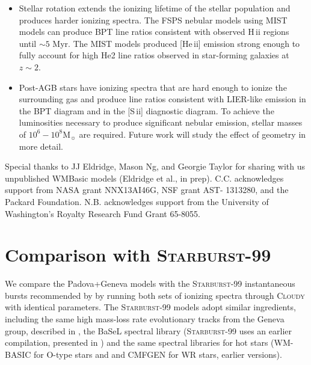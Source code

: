 \documentclass[trackchanges, twocolumn, tighten]{aastex61}
\newcommand{\FSPS}{{\sc FSPS}\xspace}
\newcommand{\SB}{\textsc{Starburst-99}\xspace}
\newcommand{\Cloudy}{\textsc{Cloudy}\xspace}
\newcommand{\sii}{[S\,{\sc ii}]\xspace}
\newcommand{\heii}{[He\,{\sc ii}]\xspace}
\newcommand\Msun{\ensuremath{\mathrm{M_{\sun}}}}
\newcommand{\hii}{H\,{\sc ii}\xspace}
\begin{document}
\begin{itemize}
\item Stellar rotation extends the ionizing lifetime of the stellar population and produces harder ionizing spectra. The \FSPS nebular models using MIST models can produce BPT line ratios consistent with observed \hii regions until ${\sim}5$ Myr. The MIST models produced \heii emission strong enough to fully account for high He2 line ratios observed in star-forming galaxies at $z{\sim}2$.
\item Post-AGB stars have ionizing spectra that are hard enough to ionize the surrounding gas and produce line ratios consistent with LIER-like emission in the BPT diagram and in the \sii{} diagnostic diagram. To achieve the luminosities necessary to produce significant nebular emission, stellar masses of $10^6-10^8\Msun$ are required. Future work will study the effect of geometry in more detail.
\end{itemize}

\acknowledgments

Special thanks to JJ Eldridge, Mason Ng, and Georgie Taylor for sharing with us unpublished WMBasic models (Eldridge et al., in prep). C.C. acknowledges support from NASA grant NNX13AI46G, NSF grant AST- 1313280, and the Packard Foundation. N.B. acknowledges support from the University of Washington's Royalty Research Fund Grant 65-8055.


\newpage

\appendix

\section{Comparison with \SB}\label{sec:appendix:B}

We compare the Padova+Geneva models with the \SB{} instantaneous bursts recommended by \citet{Levesque10} by running both sets of ionizing spectra through \Cloudy with identical parameters. The \SB{} models adopt similar ingredients, including the same high mass-loss rate evolutionary tracks from the Geneva group, described in \citet{Meynet00}, the BaSeL spectral library (\SB uses an earlier compilation, presented in \citet{Lejeune}) and the same spectral libraries for hot stars (WM-BASIC for O-type stars and and CMFGEN for WR stars, earlier versions).
\end{document}

